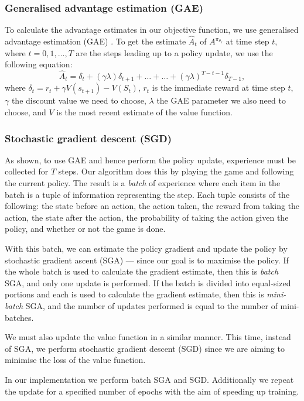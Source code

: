 \documentclass[12pt,a4paper]{article}
\begin{document}
\subsubsection{Generalised advantage estimation (GAE)}
To calculate the advantage estimates in our objective function, we use generalised advantage estimation (GAE) \cite{schulman2018highdimensional}. To get the estimate $\hat{A}_t$ of $A^{\pi_{\theta_k}}$ at time step $t$, where $t = 0, 1, \dots, T$ are the steps leading up to a policy update, we use the following equation: $$\hat{A}_t = \delta_t + (\gamma\lambda)\delta_{t+1} + \dots + \dots + (\gamma\lambda)^{T-t-1}\delta_{T-1},$$ where $\delta_t = r_t + \gamma V(s_{t+1}) - V(S_t)$, $r_t$ is the immediate reward at time step $t$, $\gamma$ the discount value we need to choose, $\lambda$ the GAE parameter we also need to choose, and $V$ is the most recent estimate of the value function. 

\subsubsection{Stochastic gradient descent (SGD)}
As shown, to use GAE and hence perform the policy update, experience must be collected for $T$ steps. Our algorithm does this by playing the game and following the current policy. The result is a \emph{batch} of experience where each item in the batch is a tuple of information representing the step. Each tuple consists of the following: the state before an action, the action taken, the reward from taking the action, the state after the action, the probability of taking the action given the policy, and whether or not the game is done.

With this batch, we can estimate the policy gradient and update the policy by stochastic gradient ascent (SGA) --- since our goal is to maximise the policy. If the whole batch is used to calculate the gradient estimate, then this is \emph{batch} SGA, and only one update is performed. If the batch is divided into equal-sized portions and each is used to calculate the gradient estimate, then this is \emph{mini-batch} SGA, and the number of updates performed is equal to the number of mini-batches. 

We must also update the value function in a similar manner. This time, instead of SGA, we perform stochastic gradient descent (SGD) since we are aiming to minimise the loss of the value function. 

In our implementation we perform batch SGA and SGD. Additionally we repeat the update for a specified number of epochs with the aim of speeding up training. 
\end{document}
